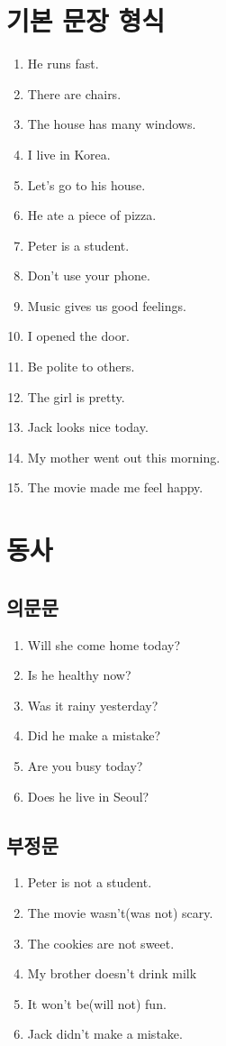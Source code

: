 \documentclass[a4paper, 12pt, twocolumn]{oblivoir}
\begin{document}
    \section{기본 문장 형식} %
    \begin{enumerate}
        \item He runs fast.
        \item There are chairs.
        \item The house has many windows. 
        \item I live in Korea.
        \item Let's go to his house.
        \item He ate a piece of pizza. 
        \item Peter is a student.
        \item Don't use your phone. 
        \item Music gives us good feelings.
        \item I opened the door. 
        \item Be polite to others. 
        \item The girl is pretty. 
        \item Jack looks nice today. 
        \item My mother went out this morning. 
        \item The movie made me feel happy. 
    \end{enumerate}


    \section{동사} %
    \subsection{의문문}
    \begin{enumerate}
        \item Will she come home today? 
        \item Is he healthy now? 
        \item Was it rainy yesterday?
        \item Did he make a mistake? 
        \item Are you busy today? 
        \item Does he live in Seoul? 
    \end{enumerate}
    \subsection{부정문}
    \begin{enumerate}
        \item Peter is not a student. 
        \item The movie wasn't(was not) scary.
        \item The cookies are not sweet. 
        \item My brother doesn't drink milk 
        \item It won't be(will not) fun. 
        \item Jack didn't make a mistake. 
    \end{enumerate}
\end{document}
